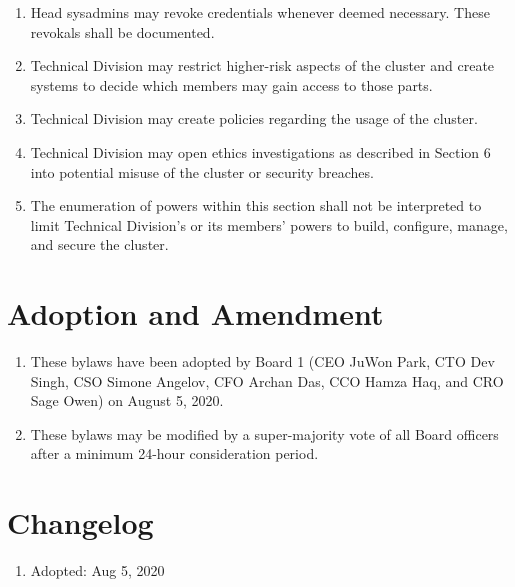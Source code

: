 \documentclass{article}
\begin{document}
\begin{enumerate}
    \item Head sysadmins may revoke credentials whenever deemed necessary. These revokals shall be documented.
    \item Technical Division may restrict higher-risk aspects of the cluster and create systems to decide which members may gain access to those parts.
    \item Technical Division may create policies regarding the usage of the cluster.
    \item Technical Division may open ethics investigations as described in Section 6 into potential misuse of the cluster or security breaches.
    \item The enumeration of powers within this section shall not be interpreted to limit Technical Division's or its members' powers to  build, configure, manage, and secure the cluster.
\end{enumerate}
\section{Adoption and Amendment}
\begin{enumerate}
    \item These bylaws have been adopted by Board 1 (CEO JuWon Park, CTO Dev Singh, CSO Simone Angelov, CFO Archan Das, CCO Hamza Haq, and CRO Sage Owen) on August 5, 2020.
    \item These bylaws may be modified by a super-majority vote of all Board officers after a minimum 24-hour consideration period.
\end{enumerate}
\section{Changelog}
\begin{enumerate}
    \item Adopted: Aug 5, 2020
\end{enumerate}
\end{document}
